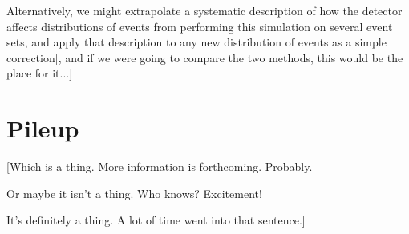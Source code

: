 Alternatively, we might extrapolate a systematic description of how the detector affects distributions of events from performing this simulation on several event sets, and apply that description to any new distribution of events as a simple correction[, and if we were going to compare the two methods, this would be the place for it...]

\section{Pileup}

[Which is a thing. More information is forthcoming. Probably.

Or maybe it isn't a thing. Who knows? Excitement!

It's definitely a thing. A lot of time went into that sentence.]
